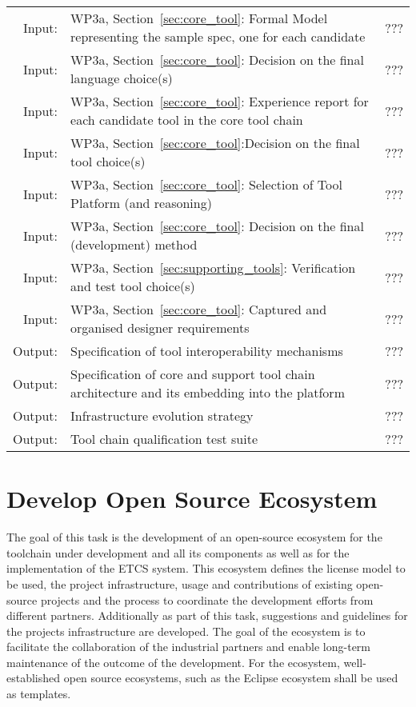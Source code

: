 \documentclass[11pt, a4paper]{article}
\newenvironment{inoutput}
{\vspace{2mm}
\noindent
\begin{tabular}{|r|p{.7\linewidth}|l|}
\hline}
{
\hline
\end{tabular}}
\begin{document}
\begin{inoutput}
Input: & WP3a, Section~\ref{sec:core_tool}: Formal Model representing the sample spec, one for each candidate  & ??? \\
Input: & WP3a, Section~\ref{sec:core_tool}: Decision on the final language choice(s) & ??? \\
Input: & WP3a, Section~\ref{sec:core_tool}: Experience report for each candidate tool in the core tool chain& ??? \\
Input: & WP3a, Section~\ref{sec:core_tool}:Decision on the final tool choice(s)  & ??? \\
Input: & WP3a, Section~\ref{sec:core_tool}: Selection of Tool Platform (and reasoning)  & ??? \\
Input: & WP3a, Section~\ref{sec:core_tool}: Decision on the final (development) method  & ??? \\
Input: & WP3a, Section~\ref{sec:supporting_tools}: Verification and test tool choice(s)  & ??? \\
Input: & WP3a, Section~\ref{sec:core_tool}: Captured and organised designer requirements  & ??? \\
\hline
Output: & Specification of tool interoperability mechanisms & ??? \\
Output: & Specification of core and support tool chain architecture and its embedding into the platform & ??? \\
Output: & Infrastructure evolution strategy & ??? \\
Output: & Tool chain qualification test suite & ??? \\
\end{inoutput}



\section{Develop Open Source Ecosystem}
The goal of this task is the development of an open-source ecosystem for the toolchain under development and all its components as well as for the implementation of the ETCS system. This ecosystem defines the license model to be used, the project infrastructure, usage and contributions of existing open-source projects and the process to coordinate the development efforts from different partners. Additionally as part of this task, suggestions and guidelines for the projects infrastructure are developed. The goal of the ecosystem is to facilitate the collaboration of the industrial partners and enable long-term maintenance of the outcome of the development. For the ecosystem, well-established open source ecosystems, such as the Eclipse ecosystem shall be used as templates.
\end{document}
